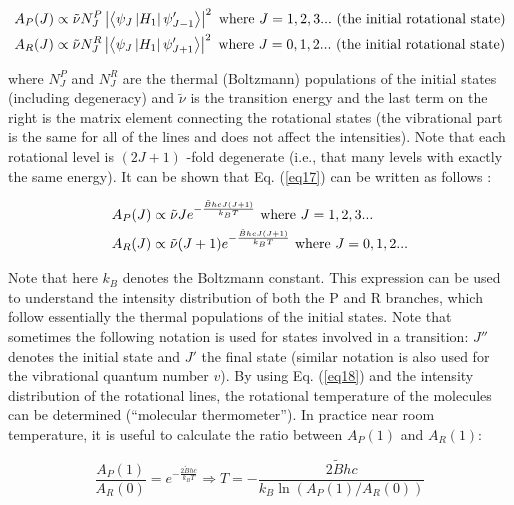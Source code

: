 \documentclass[byrevtex,amssymb,aps,pra,floatfix,letterpaper]{revtex4}
\begin{document}
\begin{align}
\label{eq17}
& A_P(J) \propto \tilde{\nu}N_J^P\left|\left<\psi_J\left|H_1\right|\psi'_{J-1}\right>\right|^2\textnormal{ where }J=1,2,3...\textnormal{ (the initial rotational state)}\\
\notag
& A_R(J) \propto \tilde{\nu}N_J^R\left|\left<\psi_J\left|H_1\right|\psi'_{J+1}\right>\right|^2\textnormal{ where }J=0,1,2...\textnormal{ (the initial rotational state)}
\notag
\end{align}

\noindent
where $N_J^P$ and $N_J^R$ are the thermal (Boltzmann) populations of the initial states (including degeneracy) and $\tilde{\nu}$ is the transition energy and the last term on the right is the matrix element connecting the rotational states (the vibrational part is the same for all of the lines and does not affect the intensities). Note that each rotational level is $(2J + 1)$ -fold degenerate (i.e., that many levels with exactly the same energy). It can be shown that Eq. (\ref{eq17}) can be written as follows \cite{HERZBERG1}:

\begin{align}
\label{eq18}
& A_P(J) \propto \tilde{\nu}Je^{-\frac{\tilde{B}hcJ(J+1)}{k_BT}}\textnormal{ where }J=1,2,3...\\
\notag
& A_R(J) \propto \tilde{\nu}(J+1)e^{-\frac{\tilde{B}hcJ(J+1)}{k_BT}}\textnormal{ where }J=0,1,2...
\end{align}

\noindent
Note that here $k_B$ denotes the Boltzmann constant. This expression can be used to understand the intensity distribution of both the P and R branches, which follow essentially the thermal populations of the initial states. Note that sometimes the following notation is used for states involved in a transition: $J''$ denotes the initial state and $J'$ the final state (similar notation is also used for the vibrational quantum number $v$). By using Eq. (\ref{eq18}) and the intensity distribution of the rotational lines, the rotational temperature of the molecules can be determined (``molecular thermometer''). In practice near room temperature, it is useful to calculate the ratio between $A_P(1)$ and $A_R(1)$:

\begin{equation}
\frac{A_P(1)}{A_R(0)} = e^{-\frac{2\tilde{B}hc}{k_BT}} \Rightarrow T = -\frac{2\tilde{B}hc}{k_B\ln\left(A_P(1)/A_R(0)\right)}
\label{eq18a}
\end{equation}
\end{document}
